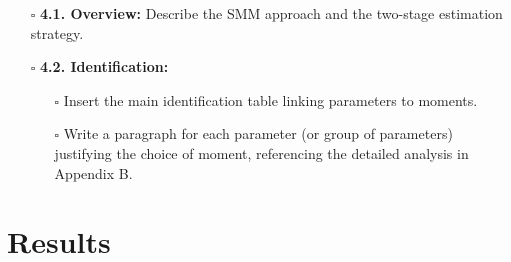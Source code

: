 \documentclass[
  11pt,
  letterpaper,
  DIV=11,
  numbers=noendperiod]{scrartcl}
\providecommand{\tightlist}{%
  \setlength{\itemsep}{0pt}\setlength{\parskip}{0pt}}\usepackage{longtable,booktabs,array}
\begin{document}
\begin{itemize}
\tightlist
\item[$\square$]
  \textbf{4.1. Overview:} Describe the SMM approach and the two-stage
  estimation strategy.
\item[$\square$]
  \textbf{4.2. Identification:}

  \begin{itemize}
  \tightlist
  \item[$\square$]
    Insert the main identification table linking parameters to moments.
  \item[$\square$]
    Write a paragraph for each parameter (or group of parameters)
    justifying the choice of moment, referencing the detailed analysis
    in Appendix B.
  \end{itemize}
\end{itemize}

\section{Results}\label{results}
\end{document}
